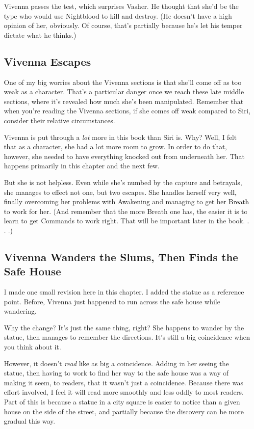 Vivenna passes the test, which surprises Vasher. He thought that she’d be the type who would use Nightblood to kill and destroy. (He doesn’t have a high opinion of her, obviously. Of course, that’s partially because he’s let his temper dictate what he thinks.)

\subsection*{Vivenna Escapes}

One of my big worries about the Vivenna sections is that she’ll come off as too weak as a character. That’s a particular danger once we reach these late middle sections, where it’s revealed how much she’s been manipulated. Remember that when you’re reading the Vivenna sections, if she comes off weak compared to Siri, consider their relative circumstances.

Vivenna is put through a \textit{lot} more in this book than Siri is. Why? Well, I felt that as a character, she had a lot more room to grow. In order to do that, however, she needed to have everything knocked out from underneath her. That happens primarily in this chapter and the next few.

But she is not helpless. Even while she’s numbed by the capture and betrayals, she manages to effect not one, but two escapes. She handles herself very well, finally overcoming her problems with Awakening and managing to get her Breath to work for her. (And remember that the more Breath one has, the easier it is to learn to get Commands to work right. That will be important later in the book. . . .)

\subsection*{Vivenna Wanders the Slums, Then Finds the Safe House}

I made one small revision here in this chapter. I added the statue as a reference point. Before, Vivenna just happened to run across the safe house while wandering.

Why the change? It’s just the same thing, right? She happens to wander by the statue, then manages to remember the directions. It’s still a big coincidence when you think about it.

However, it doesn’t \textit{read} like as big a coincidence. Adding in her seeing the statue, then having to work to find her way to the safe house was a way of making it seem, to readers, that it wasn’t just a coincidence. Because there was effort involved, I feel it will read more smoothly and less oddly to most readers. Part of this is because a statue in a city square is easier to notice than a given house on the side of the street, and partially because the discovery can be more gradual this way.


